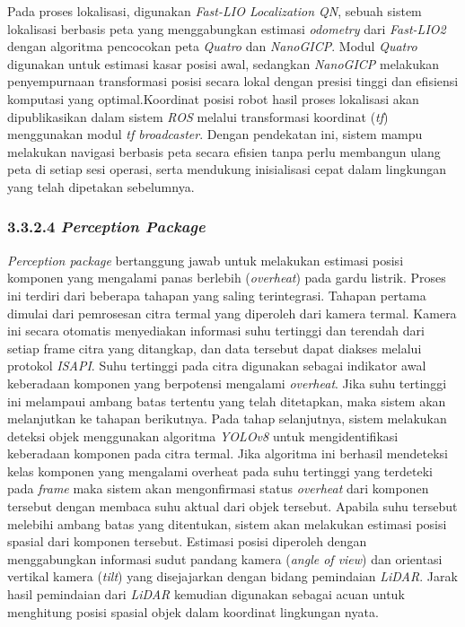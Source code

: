 Pada proses lokalisasi, digunakan \emph{Fast-LIO Localization QN}, sebuah sistem lokalisasi berbasis peta yang menggabungkan estimasi \emph{odometry} dari \emph{Fast-LIO2} dengan algoritma pencocokan peta \emph{Quatro} dan \emph{NanoGICP}. Modul \emph{Quatro} digunakan untuk estimasi kasar posisi awal, sedangkan \emph{NanoGICP} melakukan penyempurnaan transformasi posisi secara lokal dengan presisi tinggi dan efisiensi komputasi yang optimal.Koordinat posisi robot hasil proses lokalisasi akan dipublikasikan dalam sistem \emph{ROS} melalui transformasi koordinat (\emph{tf}) menggunakan modul \emph{tf broadcaster}. Dengan pendekatan ini, sistem mampu melakukan navigasi berbasis peta secara efisien tanpa perlu membangun ulang peta di setiap sesi operasi, serta mendukung inisialisasi cepat dalam lingkungan yang telah dipetakan sebelumnya.


\subsubsection{3.3.2.4 \emph{Perception Package}}

\emph{Perception package} bertanggung jawab untuk melakukan estimasi posisi komponen yang mengalami panas berlebih (\emph{overheat}) pada gardu listrik. Proses ini terdiri dari beberapa tahapan yang saling terintegrasi. Tahapan pertama dimulai dari pemrosesan citra termal yang diperoleh dari kamera termal. Kamera ini secara otomatis menyediakan informasi suhu tertinggi dan terendah dari setiap frame citra yang ditangkap, dan data tersebut dapat diakses melalui protokol \emph{ISAPI}. Suhu tertinggi pada citra digunakan sebagai indikator awal keberadaan komponen yang berpotensi mengalami \emph{overheat}. Jika suhu tertinggi ini melampaui ambang batas tertentu yang telah ditetapkan, maka sistem akan melanjutkan ke tahapan berikutnya. Pada tahap selanjutnya, sistem melakukan deteksi objek menggunakan algoritma \emph{YOLOv8} untuk mengidentifikasi keberadaan komponen pada citra termal. Jika algoritma ini berhasil mendeteksi kelas komponen yang mengalami overheat pada suhu tertinggi yang terdeteki pada \emph{frame} maka sistem akan mengonfirmasi status \emph{overheat} dari komponen tersebut dengan membaca suhu aktual dari objek tersebut. Apabila suhu tersebut melebihi ambang batas yang ditentukan, sistem akan melakukan estimasi posisi spasial dari komponen tersebut. Estimasi posisi diperoleh dengan menggabungkan informasi sudut pandang kamera (\emph{angle of view}) dan orientasi vertikal kamera (\emph{tilt}) yang disejajarkan dengan bidang pemindaian \emph{LiDAR}. Jarak hasil pemindaian dari \emph{LiDAR} kemudian digunakan sebagai acuan untuk menghitung posisi spasial objek dalam koordinat lingkungan nyata.

